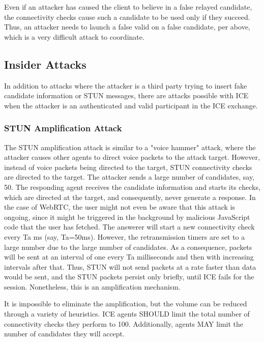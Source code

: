 \documentclass{article}
\begin{document}
Even if an attacker has caused the client to believe in a false relayed candidate, the connectivity checks cause such a candidate to be used only if they succeed.  Thus, an attacker needs to launch a false valid on a false candidate, per above, which is a very difficult attack to coordinate.

\subsection{Insider Attacks}

In addition to attacks where the attacker is a third party trying to insert fake candidate information or STUN messages, there are attacks possible with ICE when the attacker is an authenticated and valid participant in the ICE exchange.

\subsubsection{STUN Amplification Attack}

The STUN amplification attack is similar to a "voice hammer" attack, where the attacker causes other agents to direct voice packets to the attack target.  However, instead of voice packets being directed to the target, STUN connectivity checks are directed to the target.  The attacker sends a large number of candidates, say, 50.  The responding agent receives the candidate information and starts its checks, which are directed at the target, and consequently, never generate a response.  In the case of WebRTC, the user might not even be aware that this attack is ongoing, since it might be triggered in the background by malicious JavaScript code that the user has fetched. The answerer will start a new connectivity check every Ta ms (say, Ta=50ms).  However, the retransmission timers are set to a large number due to the large number of candidates.  As a consequence, packets will be sent at an interval of one every Ta milliseconds and then with increasing intervals after that.  Thus, STUN will not send packets at a rate faster than data would be sent, and the STUN packets persist only briefly, until ICE fails for the session. Nonetheless, this is an amplification mechanism.

It is impossible to eliminate the amplification, but the volume can be reduced through a variety of heuristics.  ICE agents SHOULD limit the total number of connectivity checks they perform to 100. Additionally, agents MAY limit the number of candidates they will accept.
\end{document}

